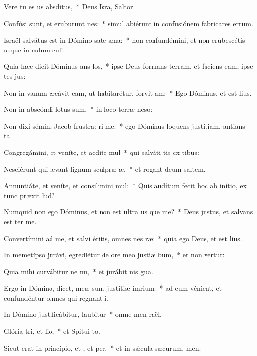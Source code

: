 \item Vere tu es us absditus,~* Deus Isra, Saltor.
\item Confúsi sunt, et eruburunt nes:~* simul abiérunt in confusiónem fabricares errum.
\item Israël salvátus est in Dómino sate æna:~* non confundémini, et non erubescétis usque in culum culi.
\item Quia hæc dicit Dóminus ans los,~* ipse Deus formans terram, et fáciens eam, ipse tes jus:
\item Non in vanum creávit eam, ut habitarétur, forvit am:~* Ego Dóminus, et  est lius.
\item Non in abscóndi lotus sum,~* in loco terræ neso:
\item Non dixi sémini Jacob frustra: ri me:~* ego Dóminus loquens justítiam, antians ta.
\item Congregámini, et veníte, et acdite mul~* qui salváti tis ex tibus:
\item Nesciérunt qui levant lignum sculpræ æ,~* et rogant deum  saltem.
\item Annuntiáte, et veníte, et consilimini mul:~* Quis audítum fecit hoc ab inítio, ex tunc præxit lud?
\item Numquid non ego Dóminus, et non est ultra us que me?~* Deus justus, et salvans  est ter me.
\item Convertímini ad me, et salvi éritis, omnes nes ræ:~* quia ego Deus, et  est lius.
\item In memetípso jurávi, egrediétur de ore meo justiæ bum,~* et non vertur:
\item Quia mihi curvábitur ne nu,~* et jurábit nis gua.
\item Ergo in Dómino, dicet, meæ sunt justítiæ  imrium:~* ad eum vénient, et confundéntur omnes qui regnant i.
\item In Dómino justificábitur,  laubitur~* omne men raël.
\item Glória tri, et lio,~* et Spitui to.
\item Sicut erat in princípio, et , et per,~* et in sǽcula sæcurum. men.
